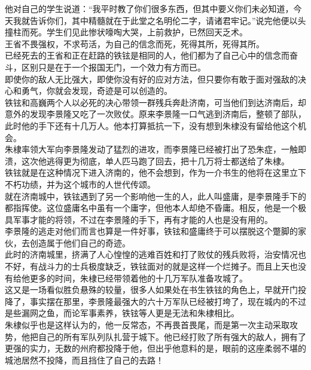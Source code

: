 \begin{multicols}{\theparacolNo}
他对自己的学生说道：“我平时教了你们很多东西，但其中要义你们未必知道，今天我就告诉你们，其中精髓就在于此堂之名明伦二字，请诸君牢记。”说完他便以头撞柱而死。学生们见此惨状嚎啕大哭，上前救护，已然回天乏术。\\

王省不畏强权，不求苟活，为自己的信念而死，死得其所，死得其所。\\

已经死去的王省和正在赶路的铁铉是相同的人，他们都为了自己心中的信念而奋斗，区别只是在于一个报国无门，一个效力有方而已。\\

即使你的敌人无比强大，即使你没有好的应对方法，但只要你有敢于面对强敌的决心和勇气，你就会发现，奇迹是可以创造的。\\

铁铉和高巍两个人以必死的决心带领一群残兵奔赴济南，可当他们到达济南后，却意外的发现李景隆又吃了一次败仗。原来李景隆一口气逃到济南后，整顿了部队，此时他的手下还有十几万人。他本打算抵抗一下，没有想到朱棣没有留给他这个机会。\\

朱棣率领大军向李景隆发动了猛烈的进攻，而李景隆已经被打出了恐朱症，一触即溃，这次他逃得更为彻底，单人匹马跑了回去，把十几万将士都送给了朱棣。\\

铁铉就是在这种情况下进入济南的，他不会想到，作为一介书生的他将在这里立下不朽功绩，并为这个城市的人世代传颂。\\

就在济南城中，铁铉遇到了另一个影响他一生的人，此人叫盛庸，是李景隆手下的都指挥使。这位盛庸名中虽有一个庸字，但他本人却绝不昏庸。相反，他是一个极具军事才能的将领，不过在李景隆的手下，再有才能的人也是没有用的。\\

李景隆的逃走对他们而言也算是一件好事，铁铉和盛庸终于可以摆脱这个蹩脚的家伙，去创造属于他们自己的奇迹。\\

此时的济南城里，挤满了人心惶惶的逃难百姓和打了败仗的残兵败将，治安情况也不好，有战斗力的士兵极度缺乏，铁铉面对的就是这样一个烂摊子。而且上天也没有给他更多的时间，朱棣已经带领着他的十几万军队准备攻城了。\\

这又是一场看似胜负悬殊的较量，很多人如果处在书生铁铉的角色上，早就开门投降了，事实摆在那里，李景隆最强大的六十万军队已经被打垮了，现在城内的不过是些漏网之鱼，而论军事素养，铁铉等人更是无法和朱棣相比。\\

朱棣似乎也是这样认为的，他一反常态，不再畏首畏尾，而是第一次主动采取攻势，他把自己的所有军队列队扎营于城下。他已经打败了所有强大的敌人，拥有了更强的实力，无数的州府都投降于他，但出乎他意料的是，眼前的这座柔弱不堪的城池居然不投降，而且挡住了自己的去路！\\


\end{multicols}
